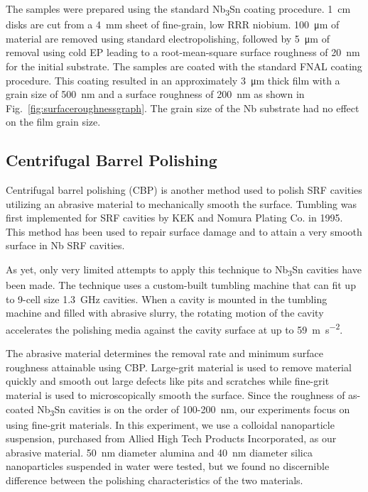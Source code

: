 \documentclass[reprint,amsmath,amssymb,aps]{revtex4-2}%
\begin{document}
The samples were prepared using the standard Nb\textsubscript{3}Sn coating procedure. 1~\unit{\centi\metre} disks are cut from a 4~\unit{\milli\metre} sheet of fine-grain, low RRR niobium. 100~\unit{\micro\metre} of material are removed using standard electropolishing\cite{saito2003development}, followed by 5~\unit{\micro\metre} of removal using cold EP leading to a root-mean-square surface roughness of 20~nm for the initial substrate.\cite{crawford2017extreme} The samples are coated with the standard FNAL coating procedure.\cite{posen2017nb3sn} This coating resulted in an approximately 3~\unit{\micro\metre} thick film with a grain size of 500~\unit{\nano\metre} and a surface roughness of 200~nm as shown in Fig.~\ref{fig:surfaceroughnessgraph}. The grain size of the Nb substrate had no effect on the film grain size.
%
\subsection{Centrifugal Barrel Polishing}%
\label{subsec:CentrifugalBarrelPolishing}%
Centrifugal barrel polishing (CBP) is another method used to polish SRF cavities utilizing an abrasive material to mechanically smooth the surface. Tumbling was first implemented for SRF cavities by KEK and Nomura Plating Co. in 1995\cite{higuchi1996investigation}. This method has been used to repair surface damage and to attain a very smooth surface in Nb SRF cavities\cite{cooper2012mirror, cooper2011centrifugal}. 

As yet, only very limited attempts to apply this technique to Nb\textsubscript{3}Sn cavities have been made. The technique uses a custom-built tumbling machine that can fit up to 9-cell size 1.3~GHz cavities. When a cavity is mounted in the tumbling machine and filled with abrasive slurry, the rotating motion of the cavity accelerates the polishing media against the cavity surface at up to 59~\unit{\metre\per\square\second}. 

The abrasive material determines the removal rate and minimum surface roughness attainable using CBP. Large-grit material is used to remove material quickly and smooth out large defects like pits and scratches while fine-grit material is used to microscopically smooth the surface. Since the roughness of as-coated Nb\textsubscript{3}Sn cavities is on the order of 100-200~nm, our experiments focus on using fine-grit materials. In this experiment, we use a colloidal nanoparticle suspension, purchased from Allied High Tech Products Incorporated, as our abrasive material. 50~nm diameter alumina and 40~nm diameter silica nanoparticles suspended in water were tested, but we found no discernible difference between the polishing characteristics of the two materials.
\end{document}
